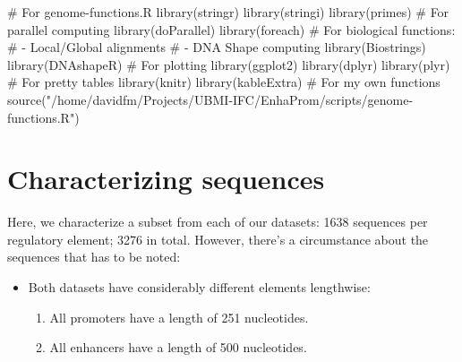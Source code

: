 \documentclass[
  letterpaper,
  DIV=11,
  numbers=noendperiod]{scrartcl}
\newenvironment{Shaded}{\begin{snugshade}}{\end{snugshade}}
\newcommand{\CommentTok}[1]{\textcolor[rgb]{0.37,0.37,0.37}{#1}}
\newcommand{\FunctionTok}[1]{\textcolor[rgb]{0.28,0.35,0.67}{#1}}
\newcommand{\NormalTok}[1]{\textcolor[rgb]{0.00,0.23,0.31}{#1}}
\newcommand{\StringTok}[1]{\textcolor[rgb]{0.13,0.47,0.30}{#1}}
\providecommand{\tightlist}{%
  \setlength{\itemsep}{0pt}\setlength{\parskip}{0pt}}\usepackage{longtable,booktabs,array}
\begin{document}
\begin{Shaded}
\begin{Highlighting}[]
\CommentTok{\# For genome{-}functions.R}
\FunctionTok{library}\NormalTok{(stringr)}
\FunctionTok{library}\NormalTok{(stringi)}
\FunctionTok{library}\NormalTok{(primes)}
\CommentTok{\# For parallel computing}
\FunctionTok{library}\NormalTok{(doParallel)}
\FunctionTok{library}\NormalTok{(foreach)}
\CommentTok{\# For biological functions: }
\CommentTok{\#   {-} Local/Global alignments }
\CommentTok{\#   {-} DNA Shape computing}
\FunctionTok{library}\NormalTok{(Biostrings)}
\FunctionTok{library}\NormalTok{(DNAshapeR)}
\CommentTok{\# For plotting}
\FunctionTok{library}\NormalTok{(ggplot2)}
\FunctionTok{library}\NormalTok{(dplyr)}
\FunctionTok{library}\NormalTok{(plyr)}
\CommentTok{\# For pretty tables}
\FunctionTok{library}\NormalTok{(knitr)}
\FunctionTok{library}\NormalTok{(kableExtra)}
\CommentTok{\# For my own functions}
\FunctionTok{source}\NormalTok{(}\StringTok{"/home/davidfm/Projects/UBMI{-}IFC/EnhaProm/scripts/genome{-}functions.R"}\NormalTok{)}
\end{Highlighting}
\end{Shaded}

\section{Characterizing sequences}\label{characterizing-sequences}

Here, we characterize a subset from each of our datasets: 1638 sequences
per regulatory element; 3276 in total. However, there's a circumstance
about the sequences that has to be noted:

\begin{itemize}
\tightlist
\item
  Both datasets have considerably different elements lengthwise:

  \begin{enumerate}
  \def\labelenumi{\arabic{enumi}.}
  \tightlist
  \item
    All promoters have a length of 251 nucleotides.
  \item
    All enhancers have a length of 500 nucleotides.
  \end{enumerate}
\end{itemize}
\end{document}
